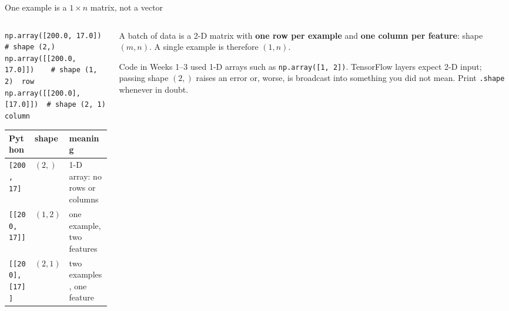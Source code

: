 \documentclass[aspectratio=169,10pt]{beamer}
\begin{document}
\begin{frame}[fragile]{One example is a $1\times n$ matrix, not a vector}
  \begin{columns}[T,onlytextwidth]
    \begin{column}{0.5\textwidth}
\begin{lstlisting}
np.array([200.0, 17.0])      # shape (2,)
np.array([[200.0, 17.0]])    # shape (1, 2)  row
np.array([[200.0], [17.0]])  # shape (2, 1)  column
\end{lstlisting}
      \vspace{2mm}
      \footnotesize
      \renewcommand{\arraystretch}{1.2}
      \begin{tabular}{@{}lll@{}}
        \toprule
        Python & shape & meaning\\
        \midrule
        \texttt{[200, 17]}       & $(2,)$  & 1-D array: no rows or columns\\
        \texttt{[[200, 17]]}     & $(1,2)$ & one example, two features\\
        \texttt{[[200],[17]]}    & $(2,1)$ & two examples, one feature\\
        \bottomrule
      \end{tabular}
    \end{column}
    \begin{column}{0.46\textwidth}
      \begin{defnbox}
        \small
        A batch of data is a 2-D matrix with \textbf{one row per example} and \textbf{one
        column per feature}: shape $(m, n)$. A single example is therefore $(1, n)$.
      \end{defnbox}
      \begin{pitfall}[1-D arrays]
        \small
        Code in Weeks 1--3 used 1-D arrays such as \texttt{np.array([1, 2])}. TensorFlow layers
        expect 2-D input; passing shape $(2,)$ raises an error or, worse, is broadcast into
        something you did not mean. Print \texttt{.shape} whenever in doubt.
      \end{pitfall}
    \end{column}
  \end{columns}
\end{frame}
\end{document}
